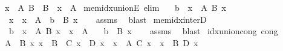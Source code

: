 \begin{isabellebody}
\ \ {\isachardoublequoteopen}{\isasymInter}x\ {\isasymin}\ A{\isachardot}{\kern0pt}\ B{\isachardoublequoteclose}\ {\isasymrightleftharpoons}\ {\isachardoublequoteopen}{\isasymInter}{\isacharbraceleft}{\kern0pt}B\ {\isacharbar}{\kern0pt}\ x\ {\isasymin}\ A{\isacharbraceright}{\kern0pt}{\isachardoublequoteclose}\isanewline
\isanewline
\isanewline
{}\isamarkupfalse%
\ mem{\isacharunderscore}{\kern0pt}idx{\isacharunderscore}{\kern0pt}unionE\ {\isacharbrackleft}{\kern0pt}elim{\isacharbang}{\kern0pt}{\isacharbrackright}{\kern0pt}{\isacharcolon}{\kern0pt}\isanewline
\ \ \ {\isachardoublequoteopen}b\ {\isasymin}\ {\isacharparenleft}{\kern0pt}{\isasymUnion}x\ {\isasymin}\ A{\isachardot}{\kern0pt}\ B\ x{\isacharparenright}{\kern0pt}{\isachardoublequoteclose}\isanewline
\ \ \ x\ \ {\isachardoublequoteopen}x\ {\isasymin}\ A{\isachardoublequoteclose}\ \ {\isachardoublequoteopen}b\ {\isasymin}\ B\ x{\isachardoublequoteclose}\isanewline
%
\isadelimproof
\ \ %
\endisadelimproof
%
\isatagproof
{}\isamarkupfalse%
\ assms\ \isamarkupfalse%
\ blast%
\endisatagproof
{\isafoldproof}%
%
\isadelimproof
\isanewline
%
\endisadelimproof
\isanewline
{}\isamarkupfalse%
\ mem{\isacharunderscore}{\kern0pt}idx{\isacharunderscore}{\kern0pt}interD{\isacharcolon}{\kern0pt}\isanewline
\ \ \ {\isachardoublequoteopen}b\ {\isasymin}\ {\isacharparenleft}{\kern0pt}{\isasymInter}x\ {\isasymin}\ A{\isachardot}{\kern0pt}\ B\ x{\isacharparenright}{\kern0pt}{\isachardoublequoteclose}\ \ {\isachardoublequoteopen}x\ {\isasymin}\ A{\isachardoublequoteclose}\isanewline
\ \ \ {\isachardoublequoteopen}b\ {\isasymin}\ B\ x{\isachardoublequoteclose}\isanewline
%
\isadelimproof
\ \ %
\endisadelimproof
%
\isatagproof
{}\isamarkupfalse%
\ assms\ \isamarkupfalse%
\ blast%
\endisatagproof
{\isafoldproof}%
%
\isadelimproof
\isanewline
%
\endisadelimproof
\isanewline
{}\isamarkupfalse%
\ idx{\isacharunderscore}{\kern0pt}union{\isacharunderscore}{\kern0pt}cong\ {\isacharbrackleft}{\kern0pt}cong{\isacharbrackright}{\kern0pt}{\isacharcolon}{\kern0pt}\isanewline
\ \ {\isachardoublequoteopen}{\isasymlbrakk}A\ {\isacharequal}{\kern0pt}\ B{\isacharsemicolon}{\kern0pt}\ {\isasymAnd}x{\isachardot}{\kern0pt}\ x\ {\isasymin}\ B\ {\isasymLongrightarrow}\ C\ x\ {\isacharequal}{\kern0pt}\ D\ x{\isasymrbrakk}\ {\isasymLongrightarrow}\ {\isacharparenleft}{\kern0pt}{\isasymUnion}x\ {\isasymin}\ A{\isachardot}{\kern0pt}\ C\ x{\isacharparenright}{\kern0pt}\ {\isacharequal}{\kern0pt}\ {\isacharparenleft}{\kern0pt}{\isasymUnion}x\ {\isasymin}\ B{\isachardot}{\kern0pt}\ D\ x{\isacharparenright}{\kern0pt}{\isachardoublequoteclose}\isanewline

\end{isabellebody}
